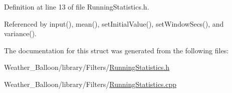 Definition at line 13 of file Running\+Statistics.\+h.



Referenced by input(), mean(), set\+Initial\+Value(), set\+Window\+Secs(), and variance().



The documentation for this struct was generated from the following files\+:\begin{DoxyCompactItemize}
\item 
Weather\+\_\+\+Balloon/library/\+Filters/\hyperlink{_running_statistics_8h}{Running\+Statistics.\+h}\item 
Weather\+\_\+\+Balloon/library/\+Filters/\hyperlink{_running_statistics_8cpp}{Running\+Statistics.\+cpp}\end{DoxyCompactItemize}

